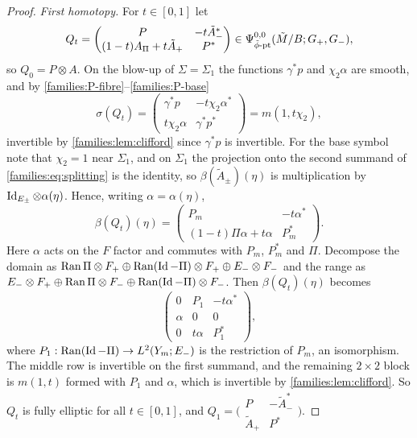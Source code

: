 \begin{proof}
  \emph{First homotopy.} For $t\in[0,1]$ let
  \begin{equation*}
    Q_t=\begin{pmatrix}P&-t\tilde A_-^*\\(1-t)A_\Pi+t\tilde A_+&P^*\end{pmatrix}
    \in\Psi^{0,0}_{\tilde\phi\text{-}\mathrm{pt}}(\tilde M/B;G_+,G_-),
  \end{equation*}
  so $Q_0=P\otimes A$. On the blow-up of $\Sigma=\Sigma_1$ the functions
  $\gamma^*p$ and $\chi_2\alpha$ are smooth, and by
  \ref{families:P-fibre}--\ref{families:P-base}
  \begin{equation*}
    \sigma(Q_t)=\begin{pmatrix}\gamma^*p&-t\chi_2\alpha^*\\t\chi_2\alpha&
    \gamma^*p^*\end{pmatrix}=m(1,t\chi_2),
  \end{equation*}
  invertible by \cref{families:lem:clifford} since $\gamma^*p$ is invertible.
  For the base symbol note that $\chi_2=1$ near $\Sigma_1$, and on $\Sigma_1$
  the projection onto the second summand of \eqref{families:eq:splitting} is
  the identity, so $\beta(\tilde A_\pm)(\eta)$ is multiplication by
  $\operatorname{Id}_{E_\pm}\otimes\alpha(\eta)$. Hence, writing $\alpha=\alpha(\eta)$,
  \begin{equation*}
    \beta(Q_t)(\eta)=\begin{pmatrix}P_m&-t\alpha^*\\
    (1-t)\Pi\alpha+t\alpha&P_m^*\end{pmatrix}.
  \end{equation*}
  Here $\alpha$ acts on the $F$ factor and commutes with $P_m$, $P_m^*$ and
  $\Pi$. Decompose the domain as $\operatorname{Ran}\Pi\otimes F_+\oplus\operatorname{Ran}(\operatorname{Id}-\Pi)\otimes
  F_+\oplus E_-\otimes F_-$ and the range as $E_-\otimes F_+\oplus\operatorname{Ran}\Pi\otimes
  F_-\oplus\operatorname{Ran}(\operatorname{Id}-\Pi)\otimes F_-$. Then $\beta(Q_t)(\eta)$ becomes
  \begin{equation*}
    \begin{pmatrix}0&P_1&-t\alpha^*\\\alpha&0&0\\0&t\alpha&P_1^*\end{pmatrix},
  \end{equation*}
  where $P_1:\operatorname{Ran}(\operatorname{Id}-\Pi)\to L^2(Y_m;E_-)$ is the restriction of $P_m$, an
  isomorphism. The middle row is invertible on the first summand, and the
  remaining $2\times2$ block is $m(1,t)$ formed with $P_1$ and $\alpha$, which is
  invertible by \cref{families:lem:clifford}. So $Q_t$ is fully elliptic for
  all $t\in[0,1]$, and $Q_1=\bigl(\begin{smallmatrix}P&-\tilde A_-^*\\ \tilde
  A_+&P^*\end{smallmatrix}\bigr)$.


\end{proof}

